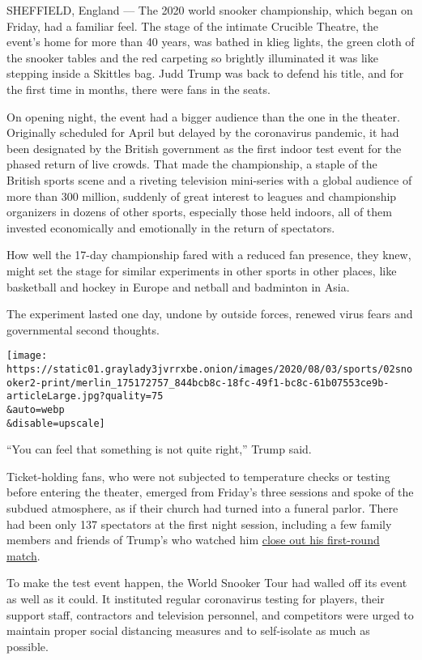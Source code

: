 SHEFFIELD, England --- The 2020 world snooker championship, which began
on Friday, had a familiar feel. The stage of the intimate Crucible
Theatre, the event's home for more than 40 years, was bathed in klieg
lights, the green cloth of the snooker tables and the red carpeting so
brightly illuminated it was like stepping inside a Skittles bag. Judd
Trump was back to defend his title, and for the first time in months,
there were fans in the seats.

On opening night, the event had a bigger audience than the one in the
theater. Originally scheduled for April but delayed by the coronavirus
pandemic, it had been designated by the British government as the first
indoor test event for the phased return of live crowds. That made the
championship, a staple of the British sports scene and a riveting
television mini-series with a global audience of more than 300 million,
suddenly of great interest to leagues and championship organizers in
dozens of other sports, especially those held indoors, all of them
invested economically and emotionally in the return of spectators.

How well the 17-day championship fared with a reduced fan presence, they
knew, might set the stage for similar experiments in other sports in
other places, like basketball and hockey in Europe and netball and
badminton in Asia.

The experiment lasted one day, undone by outside forces, renewed virus
fears and governmental second thoughts.

\texttt{[image: https://static01.graylady3jvrrxbe.onion/images/2020/08/03/sports/02snooker2-print/merlin\_175172757\_844bcb8c-18fc-49f1-bc8c-61b07553ce9b-articleLarge.jpg?quality=75\\\&auto=webp\\\&disable=upscale]}

``You can feel that something is not quite right,'' Trump said.

Ticket-holding fans, who were not subjected to temperature checks or
testing before entering the theater, emerged from Friday's three
sessions and spoke of the subdued atmosphere, as if their church had
turned into a funeral parlor. There had been only 137 spectators at the
first night session, including a few family members and friends of
Trump's who watched him
\href{http://livescores.worldsnookerdata.com/Matches/Result/14139/764763/betfred-world-championship-2020}{close
out his first-round match}.

To make the test event happen, the World Snooker Tour had walled off its
event as well as it could. It instituted regular coronavirus testing for
players, their support staff, contractors and television personnel, and
competitors were urged to maintain proper social distancing measures and
to self-isolate as much as possible.

